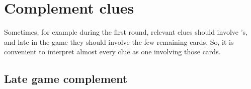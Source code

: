 \documentclass[a4paper]{article}
\theoremstyle{plain}
\theoremstyle{definition}
\newtheorem{example}[theorem]{Example}
\begin{document}
%	
%	
%
%	
%	
%	
%	
%
%	
%	
%	
%	
%


\section{Complement clues}

Sometimes, for example during the first round, relevant clues should involve 's, and late in the game they should involve the few remaining cards. So, it is convenient to interpret almost every clue as one involving those cards.

\subsection{Late game complement}
\end{document}
